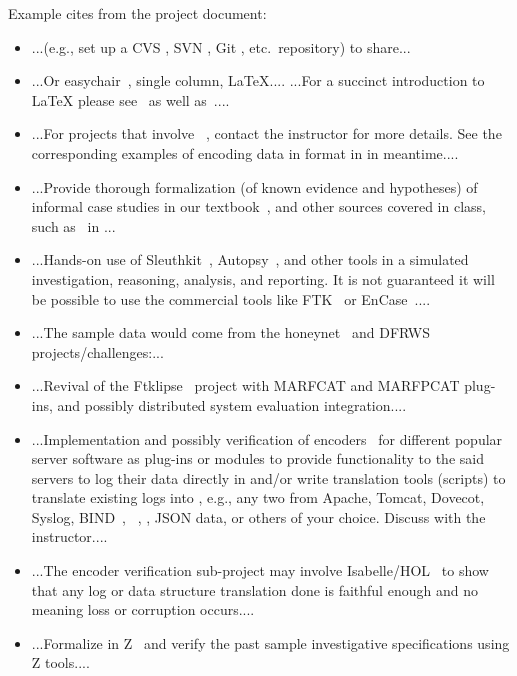 \documentclass{easychair}
\begin{document}
Example cites from the project document:

\begin{itemize}
	\item 
...(e.g., set up a CVS \cite{cvs}, SVN \cite{svn}, Git \cite{aosa-book-vol2-git}, etc.\ repository) to share...
	\item 
...Or easychair~\cite{easychair-latex-class}, single column, {\LaTeX}....
%
...For a succinct introduction to {\LaTeX} please see~\cite{grogono2001}
as well as~\cite{wiki:wikibook:latex}....
	\item 
...For projects that involve {\flucid}~\cite{mokhov-phd-thesis-2013}, contact
the instructor for more details. See the corresponding examples of encoding
data in {\flucid} format in \cite[Chapter 9]{mokhov-phd-thesis-2013} in meantime....
	\item 
...Provide thorough formalization (of known evidence and hypotheses) of informal
case studies in our textbook~\cite[Chapters 3, 7]{boismenu-inse691e-f2012},
and other sources covered in class, such as~\cite{conu-sec-anne-mja-1995} in {\flucid}...
	\item 
...Hands-on use of
Sleuthkit~\cite{sleuthkit},
Autopsy~\cite{autopsy-forensic-browser},
and other tools in a simulated investigation,
reasoning, analysis, and reporting.
%
It is not guaranteed it will be possible to use the commercial
tools like FTK~\cite{ftk} or EnCase~\cite{encase,encase-forensics-ence-study-guide-2012}....
	\item 
...The sample data would come from the honeynet~\cite{honeynet} and DFRWS~\cite{palmer01} projects/challenges:...
	\item 
...Revival of the Ftklipse~\cite{ftklipse,ftklipse-srs,ftklipse-sdd} project with
MARFCAT and MARFPCAT plug-ins, and possibly distributed system evaluation
integration....
	\item 
...Implementation and possibly verification of {\flucid} encoders~\cite{mac-spoofer-analyzer-detail-fps2014} for
different popular server software as plug-ins or modules to provide
functionality to the said servers to log their data directly in
{\flucid} and/or write translation tools (scripts) to translate
existing logs into {\flucid}, e.g., any two from Apache, Tomcat, Dovecot,
Syslog, BIND~\cite{dns-and-bind-98}, ~\cite{linux-iptables-pocket-2004,%
linux-firewalls-ids-2007}, , JSON data, or others of your choice. Discuss with the
instructor....

	\item 
...The encoder verification sub-project may involve Isabelle/HOL~\cite{isabelle,isabelle-hol-tutorial}
to show that any log or data structure translation done is faithful enough and no meaning loss
or corruption occurs....

	\item 
...Formalize {\flucid} in Z~\cite{cztweb,zref92} and verify
the past sample {\flucid} investigative specifications
using Z tools....

\end{itemize}
\end{document}

